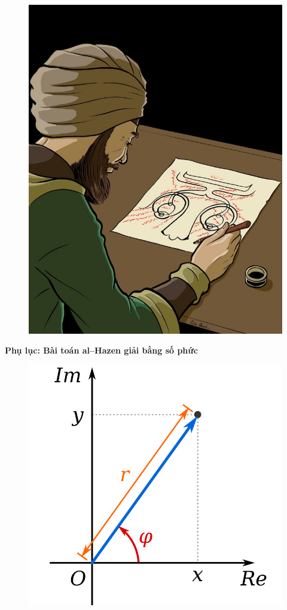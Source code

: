 \begin{multicols}{2}
\begin{figure}[H]
		\captionsetup{labelformat= empty, justification=centering}
		\includegraphics[width= 0.85\linewidth]{11}
		\vspace*{-5pt}
	\end{figure}
	\textbf{\color{lichsutoanhoc}Phụ lục: Bài toán al--Hazen giải bằng số phức}
	\begin{figure}[H]
		\vspace*{-5pt}
		\centering
		\captionsetup{labelformat= empty, justification=centering}
		\includegraphics[width= 0.75\linewidth]{12}

\end{figure}
\end{multicols}
